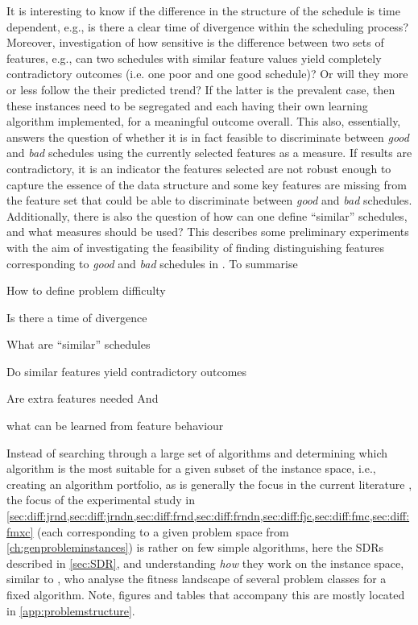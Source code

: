It is interesting to know if the difference in the structure of the schedule is time dependent, e.g.,  is there a clear time of divergence within the scheduling process? 
Moreover, investigation of how sensitive is the difference between two sets of features, e.g.,  can two schedules with similar feature values yield completely contradictory outcomes (i.e. one poor and one good schedule)? Or will they more or less follow the their predicted trend? If the latter is the prevalent case, then these instances need to be segregated and each having their own learning algorithm implemented, for a meaningful outcome overall.  
This also, essentially, answers the question of whether  it is in fact feasible to discriminate between \emph{good} and \emph{bad} schedules using the currently selected features as a measure. If results are contradictory, it is an indicator the features selected are not robust enough to capture the essence of the data structure and some key features are missing from the feature set that could be able to discriminate between \emph{good} and \emph{bad} schedules. 
Additionally, there is also the question of how can one define ``similar'' 
schedules, and what measures should be used? This 
 describes some preliminary experiments with 
the aim of investigating the feasibility of finding distinguishing features 
corresponding to \emph{good} and \emph{bad} schedules in \jsp. To summarise
\begin{enumerate*}[itemjoin={{? }}, itemjoin*={{? And }}, after={{? }}]
	\item How to define problem difficulty
	\item Is there a time of divergence
	\item What are ``similar'' schedules
	\item Do similar features yield contradictory outcomes
	\item Are extra features needed
	And \item what can be learned from feature behaviour
\end{enumerate*}

Instead of searching through a large set of algorithms  and determining which algorithm is the most suitable for a given subset of the instance space, i.e., creating an algorithm portfolio, as is generally the focus in the current literature \citep{SmithMilesLion3,SmithMilesLion5,Corne10}, the focus of the experimental study in \cref{sec:diff:jrnd,sec:diff:jrndn,sec:diff:frnd,sec:diff:frndn,sec:diff:fjc,sec:diff:fmc,sec:diff:fmxc} 
(each corresponding to a given problem space from \cref{ch:genprobleminstances})
is rather on few simple algorithms, here the SDRs described in \cref{sec:SDR}, and understanding \emph{how} they work on the instance space, similar to \citet{Whitley}, who analyse the fitness landscape of several problem classes for a fixed algorithm. 
Note, figures and tables that accompany this  are mostly located in \cref{app:problemstructure}.


